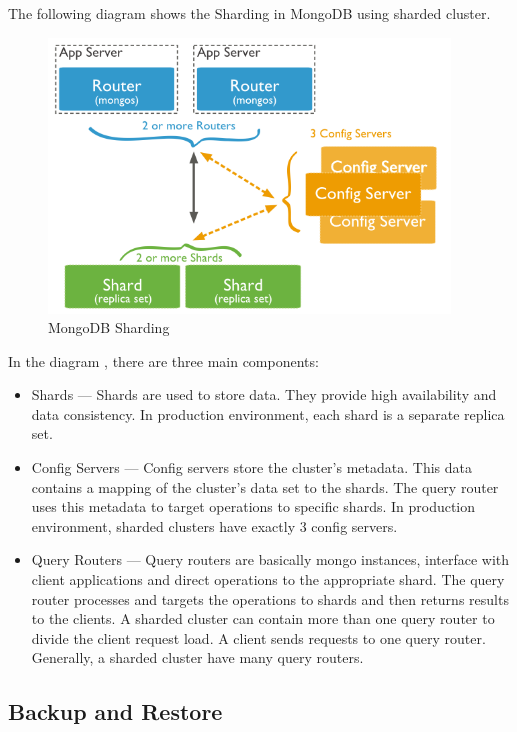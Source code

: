 \documentclass[12pt]{article}
\begin{document}
\begin{bashcode}
\begin{bashcode}
The following diagram shows the Sharding in MongoDB using sharded cluster.
\begin{figure}[H]
  \begin{center}
    \includegraphics[width=0.95\textwidth]{sharding}
  \end{center}
  \caption{MongoDB Sharding}
  \label{fig:mongo-sharding}
\end{figure}

In the diagram , there are three main components:
\begin{itemize}
  \item Shards --- Shards are used to store data. They provide high
    availability and data consistency. In production environment, each
    shard is a separate replica set.
  \item Config Servers --- Config servers store the cluster's metadata.
    This data contains a mapping of the cluster's data set to the
    shards. The query router uses this metadata to target operations to
    specific shards. In production environment, sharded clusters have
    exactly 3 config servers.
  \item Query Routers --- Query routers are basically mongo instances,
    interface with client applications and direct operations to the
    appropriate shard. The query router processes and targets the
    operations to shards and then returns results to the clients. A
    sharded cluster can contain more than one query router to divide the
    client request load. A client sends requests to one query router.
    Generally, a sharded cluster have many query routers.
\end{itemize}

\newpage
\subsection{Backup and Restore}


\end{bashcode}
\end{bashcode}
\end{document}
